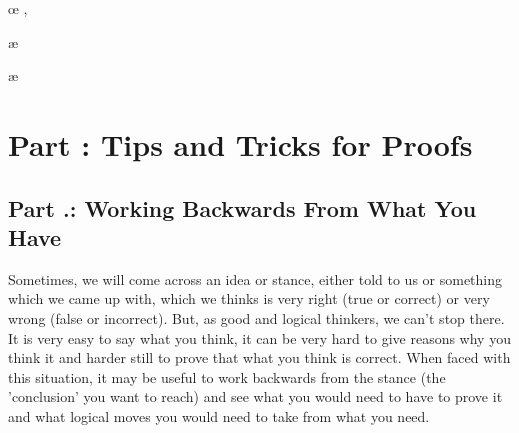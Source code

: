 \begin{fitchproof}
 
\end{fitchproof}

\begin{fitchproof}
 
\end{fitchproof}

\begin{fitchproof}
\by{\_}{ , }
\end{fitchproof}

\begin{fitchproof}
\oe{ , }
\end{fitchproof}

\begin{fitchproof}
\ae{ }
\end{fitchproof}

\begin{fitchproof}
\ae{ }
\ce{,}
\end{fitchproof}
\setcounter{seccount}{1}
\chapter{Part \thechapcount: Tips and Tricks for Proofs}
\section{Part \thechapcount.\theseccount: Working Backwards From What You Have}
Sometimes, we will come across an idea or stance, either told to us or something which we came up with, which we thinks is very right (true or correct) or very wrong (false or incorrect). But, as good and logical thinkers, we can't stop there. It is very easy to say what you think, it can be very hard to give reasons why you think it and harder still to prove that what you think is correct. When faced with this situation, it may be useful to work backwards from the stance (the 'conclusion' you want to reach) and see what you would need to have to prove it and what logical moves you would need to take from what you need. 

